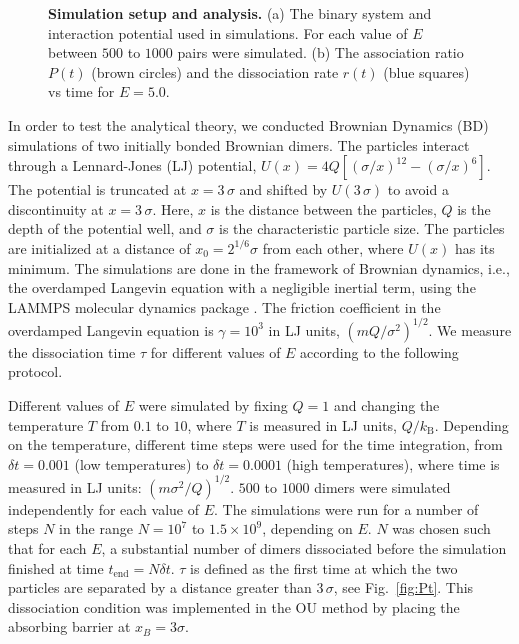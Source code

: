 \documentclass[twocolumn,pre,aps,showpacs,a4paper,floatfix,amssymb]{revtex4-1}
\newcommand{\refig}[1]{Fig.~\ref{#1}}
\begin{document}
\begin{figure}[b]

\caption{{\bf Simulation setup and analysis.} 
(a) The binary system and interaction potential used in simulations.
For each value of $E$ between $500$ to $1000$ pairs were simulated.
(b) The association ratio $P(t)$ (brown circles) 
and the dissociation rate $r(t)$ (blue squares)
vs time for $E=5.0$.
}\label{fig:simulation} 
\end{figure}

In order to test the analytical theory, we conducted Brownian Dynamics (BD) simulations of two initially bonded Brownian dimers.
The particles interact through a Lennard-Jones (LJ) potential, 
$U(x)=4 Q [ ({\sigma}/{x})^{12} - ({\sigma}/{x})^{6} ]$.
The potential is truncated at $x=3\,\sigma$ and shifted by $U(3\,\sigma)$ to avoid a discontinuity at $x=3\,\sigma$.
Here, $x$ is the distance between the particles, $Q$ is the depth of the potential well, 
and $\sigma$ is the characteristic particle size.
The particles are initialized at a distance of $x_0=2^{1/6}\sigma$ from each other, 
where $U(x)$ has its minimum.
The simulations are done in the framework of Brownian dynamics, 
i.e., the overdamped Langevin equation with a negligible inertial term,
using the LAMMPS molecular dynamics package \cite{plimpton1995fast}.
The friction coefficient in the overdamped Langevin equation is $\gamma=10^3$ in LJ units, $(mQ/\sigma^2)^{1/2}$. We measure the dissociation time $\tau$ for different values of $E$ according to the following protocol. 

Different values of $E$ were simulated by fixing $Q=1$ and changing the temperature $T$ from $0.1$ to $10$, where $T$ is measured in LJ units, $Q/k_\mathrm{B}$.
Depending on the temperature, different time steps were used for the time integration, from $\delta t=0.001$ (low temperatures) to $\delta t=0.0001$ (high temperatures), 
where time is measured in LJ units: $(m\sigma^2/Q)^{1/2}$.
$500$ to $1000$ dimers were simulated independently for each value of $E$.
The simulations were run for a number of steps $N$ in the range $N=10^7$ to $1.5\times 10^9$,
depending on $E$. $N$ was chosen such that for each $E$, a substantial number of dimers dissociated before the simulation finished at time $t_\mathrm{end}=N \delta t$.
$\tau$ is defined as the first time at which the two particles are separated by a distance greater than $3\,\sigma$, see \refig{fig:Pt}. This dissociation condition was implemented in the OU method by placing the absorbing barrier at $x_B=3\sigma$.
\end{document}
